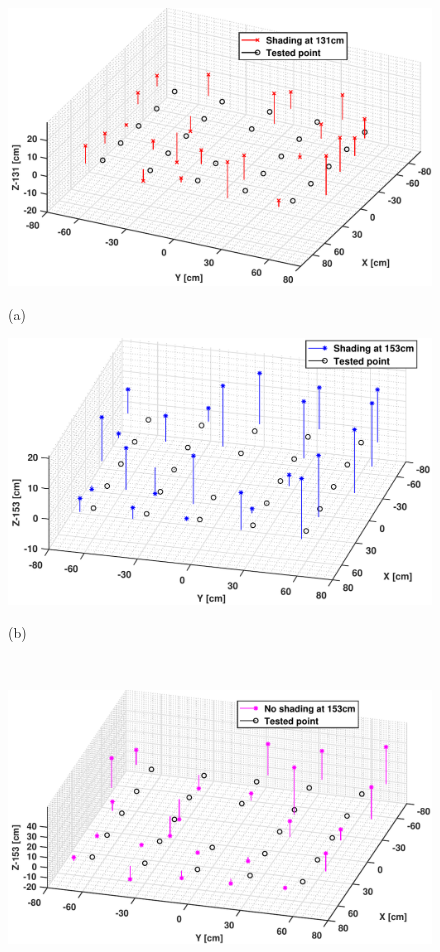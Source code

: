      \begin{figure}[!t]
                \centering
                \begin{minipage}{0.45\linewidth}
                  \centering
                  \centerline{\includegraphics[width=\textwidth]{FIG/fig12a.pdf}}
                  \centerline{(a)}
                \end{minipage}
                \begin{minipage}{0.45\linewidth}
                  \centering
                  \centerline{\includegraphics[width=\textwidth]{FIG/fig12b.pdf}}
                  \centerline{(b)}
                \end{minipage}\\
                \begin{minipage}{0.5\linewidth}
                  \centering
                  \centerline{\includegraphics[width=\textwidth]{FIG/fig12c.pdf}}

\end{minipage}
\end{figure}

